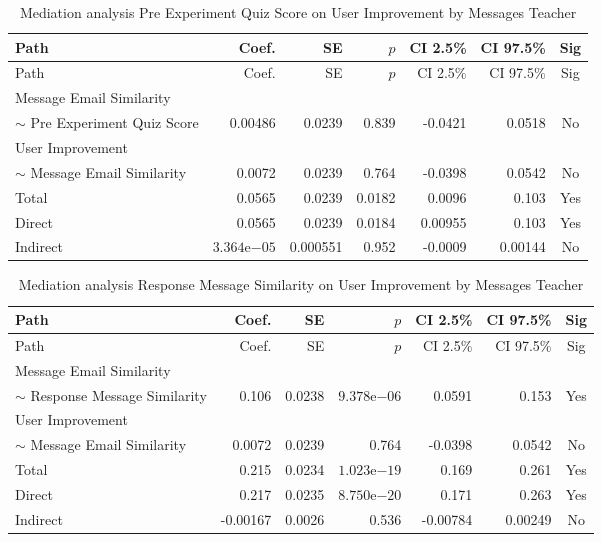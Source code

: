 \begin{longtable}{lrrrrrc}
            \caption{Mediation analysis Pre Experiment Quiz Score on User Improvement by  Messages Teacher}\label{tab:mediation Pre Experiment Quiz Score on User Improvement by  Messages Teacher}\\
            \toprule
            Path & Coef. & SE & $p$ & CI 2.5\% & CI 97.5\% & Sig \\
            \midrule
            \endfirsthead
            \toprule
            Path & Coef. & SE & $p$ & CI 2.5\% & CI 97.5\% & Sig \\
            \midrule
            \endhead
            \bottomrule
            \endfoot
            Message Email Similarity\\ $\sim$ Pre Experiment Quiz Score & 0.00486 & 0.0239 & 0.839 & -0.0421 & 0.0518 & No \\
User Improvement\\ $\sim$ Message Email Similarity & 0.0072 & 0.0239 & 0.764 & -0.0398 & 0.0542 & No \\
Total & 0.0565 & 0.0239 & 0.0182 & 0.0096 & 0.103 & Yes \\
Direct & 0.0565 & 0.0239 & 0.0184 & 0.00955 & 0.103 & Yes \\
Indirect & $3.364\mathrm{e}{-05}$ & 0.000551 & 0.952 & -0.0009 & 0.00144 & No \\
\end{longtable}

\begin{longtable}{lrrrrrc}
            \caption{Mediation analysis Response Message Similarity on User Improvement by  Messages Teacher}\label{tab:mediation Response Message Similarity on User Improvement by  Messages Teacher}\\
            \toprule
            Path & Coef. & SE & $p$ & CI 2.5\% & CI 97.5\% & Sig \\
            \midrule
            \endfirsthead
            \toprule
            Path & Coef. & SE & $p$ & CI 2.5\% & CI 97.5\% & Sig \\
            \midrule
            \endhead
            \bottomrule
            \endfoot
            Message Email Similarity\\ $\sim$ Response Message Similarity & 0.106 & 0.0238 & $9.378\mathrm{e}{-06}$ & 0.0591 & 0.153 & Yes \\
User Improvement\\ $\sim$ Message Email Similarity & 0.0072 & 0.0239 & 0.764 & -0.0398 & 0.0542 & No \\
Total & 0.215 & 0.0234 & $1.023\mathrm{e}{-19}$ & 0.169 & 0.261 & Yes \\
Direct & 0.217 & 0.0235 & $8.750\mathrm{e}{-20}$ & 0.171 & 0.263 & Yes \\
Indirect & -0.00167 & 0.0026 & 0.536 & -0.00784 & 0.00249 & No \\
\end{longtable}

